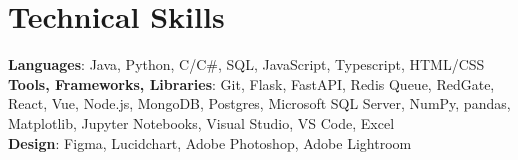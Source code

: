 \documentclass[letterpaper,11pt]{article}
\begin{document}
%
\section{Technical Skills}
 \begin{itemize}[leftmargin=0.15in, label={}]
    \small{\item{
     \textbf{Languages}{: Java, Python, C/C\#, SQL, JavaScript, Typescript, HTML/CSS} \\
     \textbf{Tools, Frameworks, Libraries}{: Git, Flask, FastAPI, Redis Queue, RedGate, React, Vue, Node.js, MongoDB, Postgres, Microsoft SQL Server, NumPy, pandas, Matplotlib, Jupyter Notebooks, Visual Studio, VS Code, Excel} \\
     \textbf{Design}{: Figma, Lucidchart, Adobe Photoshop, Adobe Lightroom}
    }}
 \end{itemize}


  
\end{document}
